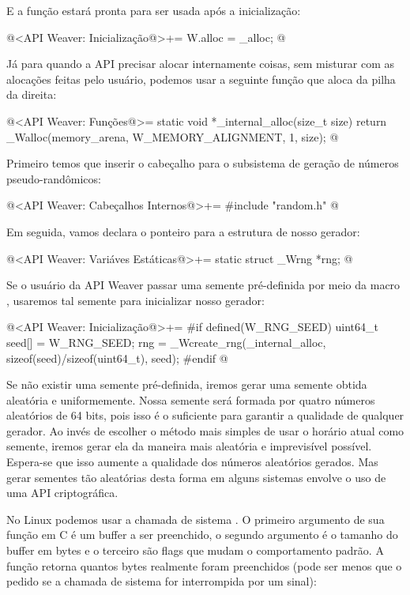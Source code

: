 E a função estará pronta para ser usada após a inicialização:

\iniciocodigo
@<API Weaver: Inicialização@>+=
W.alloc = _alloc;
@
\fimcodigo

Já para quando a API precisar alocar internamente coisas, sem misturar
com as alocações feitas pelo usuário, podemos usar a seguinte função
que aloca da pilha da direita:

\iniciocodigo
@<API Weaver: Funções@>=
static void *_internal_alloc(size_t size){
  return _Walloc(memory_arena, W_MEMORY_ALIGNMENT, 1, size);
}
@
\fimcodigo


Primeiro temos que inserir o cabeçalho para o subsistema de geração de
números pseudo-randômicos:

\iniciocodigo
@<API Weaver: Cabeçalhos Internos@>+=
#include "random.h"
@
\fimcodigo

Em seguida, vamos declara o ponteiro para a estrutura de nosso
gerador:

\iniciocodigo
@<API Weaver: Variáves Estáticas@>+=
static struct _Wrng *rng;
@
\fimcodigo

Se o usuário da API Weaver passar uma semente pré-definida por meio da
macro , usaremos tal semente para inicializar
nosso gerador:

\iniciocodigo
@<API Weaver: Inicialização@>+=
#if defined(W_RNG_SEED)
{
  uint64_t seed[] = W_RNG_SEED;
  rng = _Wcreate_rng(_internal_alloc, sizeof(seed)/sizeof(uint64_t),
                     seed);
}
#endif
@
\fimcodigo

Se não existir uma semente pré-definida, iremos gerar uma semente
obtida aleatória e uniformemente. Nossa semente será formada por
quatro números aleatórios de 64 bits, pois isso é o suficiente para
garantir a qualidade de qualquer gerador. Ao invés de escolher o
método mais simples de usar o horário atual como semente, iremos gerar
ela da maneira mais aleatória e imprevisível possível. Espera-se que
isso aumente a qualidade dos números aleatórios gerados. Mas gerar
sementes tão aleatórias desta forma em alguns sistemas envolve o uso
de uma API criptográfica.

No Linux podemos usar a chamada de sistema . O
primeiro argumento de sua função em C é um buffer a ser preenchido, o
segundo argumento é o tamanho do buffer em bytes e o terceiro são
flags que mudam o comportamento padrão. A função retorna quantos bytes
realmente foram preenchidos (pode ser menos que o pedido se a chamada
de sistema for interrompida por um sinal):

